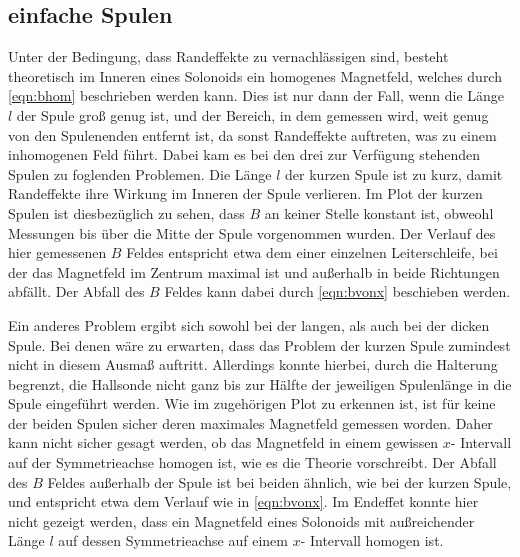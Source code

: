     \subsection{einfache Spulen}
        Unter der Bedingung, dass Randeffekte zu vernachlässigen sind, besteht theoretisch im Inneren eines Solonoids ein
        homogenes Magnetfeld, welches durch \eqref{eqn:bhom} beschrieben werden kann. Dies ist nur dann der Fall, wenn die Länge $l$
        der Spule groß genug ist, und der Bereich, in dem gemessen wird, weit genug von den Spulenenden entfernt ist, da sonst
        Randeffekte auftreten, was zu einem inhomogenen Feld führt. Dabei kam es bei den drei zur Verfügung stehenden Spulen zu
        foglenden Problemen. Die Länge $l$ der kurzen Spule ist zu kurz, damit Randeffekte ihre Wirkung im Inneren der Spule verlieren.
        Im Plot der kurzen Spulen ist diesbezüglich zu sehen, dass $B$ an keiner Stelle konstant ist, obweohl Messungen bis über die
        Mitte der Spule vorgenommen wurden. Der Verlauf des hier gemessenen $B$ Feldes entspricht etwa dem einer einzelnen Leiterschleife,
        bei der das Magnetfeld im Zentrum maximal ist und außerhalb in beide Richtungen abfällt. Der Abfall des $B$ Feldes kann dabei
        durch \eqref{eqn:bvonx} beschieben werden. 

        Ein anderes Problem ergibt sich sowohl bei der langen, als auch bei der dicken Spule. Bei denen wäre zu erwarten, dass 
        das Problem der kurzen Spule zumindest nicht in diesem Ausmaß auftritt. Allerdings konnte hierbei, durch die Halterung begrenzt,
        die Hallsonde nicht ganz bis zur Hälfte der jeweiligen Spulenlänge in die Spule eingeführt werden. Wie im zugehörigen Plot
        zu erkennen ist, ist für keine der beiden Spulen sicher deren maximales Magnetfeld gemessen worden. Daher kann nicht sicher 
        gesagt werden, ob das Magnetfeld in einem gewissen $x$- Intervall auf der Symmetrieachse homogen ist, wie es die Theorie vorschreibt.
        Der Abfall des $B$ Feldes außerhalb der Spule ist bei beiden ähnlich, wie bei der kurzen Spule, und entspricht etwa dem Verlauf
        wie in \eqref{eqn:bvonx}. 
        Im Endeffet konnte hier nicht gezeigt werden, dass ein Magnetfeld eines Solonoids mit außreichender Länge $l$ auf dessen
        Symmetrieachse auf einem $x$- Intervall homogen ist. 

